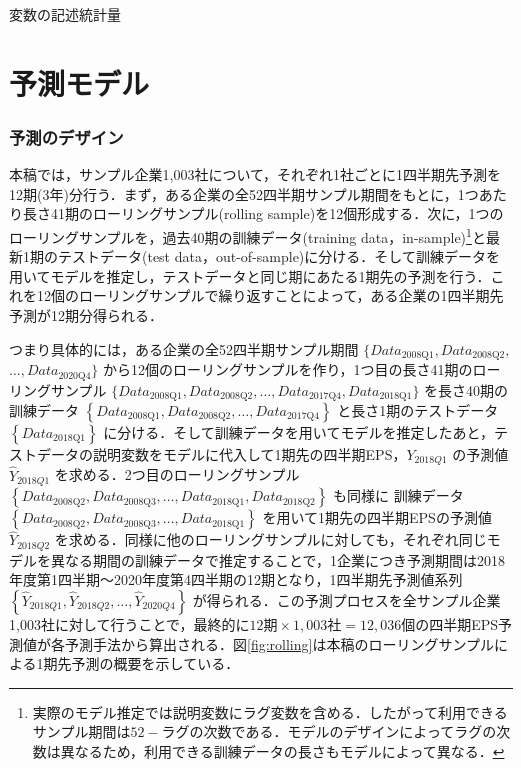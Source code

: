 \documentclass[a4paper，11pt]{jsarticle}
\begin{document}
\begin{table}[bp]
  \centering
  \caption{変数の記述統計量}
  \label{tab:summary}
  \small
  
\end{table}
    
\part{予測モデル} \label{par:model}

\section{予測のデザイン} \label{sec:rolling}

本稿では，サンプル企業1,003社について，それぞれ1社ごとに1四半期先予測を12期(3年)分行う．まず，ある企業の全52四半期サンプル期間をもとに，1つあたり長さ41期のローリングサンプル(rolling sample)を12個形成する．次に，1つのローリングサンプルを，過去40期の訓練データ(training data，in-sample)\footnote{実際のモデル推定では説明変数にラグ変数を含める．したがって利用できるサンプル期間は$52 - ラグの次数$である．モデルのデザインによってラグの次数は異なるため，利用できる訓練データの長さもモデルによって異なる．}と最新1期のテストデータ(test data，out-of-sample)に分ける．そして訓練データを用いてモデルを推定し，テストデータと同じ期にあたる1期先の予測を行う．これを12個のローリングサンプルで繰り返すことによって，ある企業の1四半期先予測が12期分得られる．

つまり具体的には，ある企業の全52四半期サンプル期間 $\{Data_{\text{2008Q1}}, Data_{\text{2008Q2}},$ $\ldots, Data_{\text{2020Q4}}\}$ から12個のローリングサンプルを作り，1つ目の長さ41期のローリングサンプル $\{Data_{\text{2008Q1}}, Data_{\text{2008Q2}},\ldots, Data_{\text{2017Q4}}, Data_{\text{2018Q1}}\}$ を長さ40期の訓練データ $\left\{Data_{\text{2008Q1}}, Data_{\text{2008Q2}}, \ldots, Data_{\text{2017Q4}}\right\}$ と長さ1期のテストデータ $\left\{Data_{\text{2018Q1}}\right\}$ に分ける．そして訓練データを用いてモデルを推定したあと，テストデータの説明変数をモデルに代入して1期先の四半期EPS，$Y_{2018Q1}$ の予測値 $\hat{Y}_{2018Q1}$ を求める．2つ目のローリングサンプル $\left\{Data_{\text{2008Q2}}, Data_{\text{2008Q3}}, \ldots, Data_{\text{2018Q1}}, Data_{\text{2018Q2}}\right\}$ も同様に 訓練データ $\left\{Data_{\text{2008Q2}}, Data_{\text{2008Q3}}, \ldots, Data_{\text{2018Q1}}\right\}$ を用いて1期先の四半期EPSの予測値 $\hat{Y}_{2018Q2}$ を求める．同様に他のローリングサンプルに対しても，それぞれ同じモデルを異なる期間の訓練データで推定することで，1企業につき予測期間は2018年度第1四半期～2020年度第4四半期の12期となり，1四半期先予測値系列 $\left\{\hat{Y}_{2018Q1}, \hat{Y}_{2018Q2}, \ldots, \hat{Y}_{2020Q4}\right\}$ が得られる．この予測プロセスを全サンプル企業1,003社に対して行うことで，最終的に$12期 \times 1,003社 = 12,036個$の四半期EPS予測値が各予測手法から算出される．図\ref{fig:rolling}は本稿のローリングサンプルによる1期先予測の概要を示している．
\end{document}
